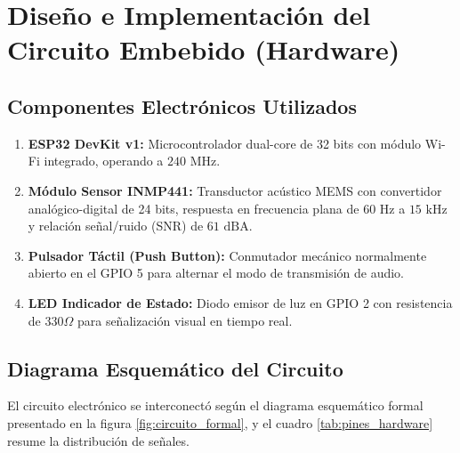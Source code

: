\documentclass{article}
\begin{document}
\section{Diseño e Implementación del Circuito Embebido (Hardware)}

\subsection{Componentes Electrónicos Utilizados}
\begin{enumerate}
    \item \textbf{ESP32 DevKit v1:} Microcontrolador dual-core de 32 bits con módulo Wi-Fi integrado, operando a $240\text{ MHz}$.
    \item \textbf{Módulo Sensor INMP441:} Transductor acústico MEMS con convertidor analógico-digital de 24 bits, respuesta en frecuencia plana de $60\text{ Hz}$ a $15\text{ kHz}$ y relación señal/ruido (SNR) de $61\text{ dBA}$.
    \item \textbf{Pulsador Táctil (Push Button):} Conmutador mecánico normalmente abierto en el GPIO 5 para alternar el modo de transmisión de audio.
    \item \textbf{LED Indicador de Estado:} Diodo emisor de luz en GPIO 2 con resistencia de $330\Omega$ para señalización visual en tiempo real.
\end{enumerate}

\subsection{Diagrama Esquemático del Circuito}
El circuito electrónico se interconectó según el diagrama esquemático formal presentado en la figura \ref{fig:circuito_formal}, y el cuadro \ref{tab:pines_hardware} resume la distribución de señales.
\end{document}
